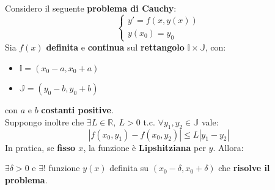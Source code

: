 \documentclass[a4paper, oneside]{article}
\newcommand\R{\mathbb{R}}
\newcommand\I{\mathbb{I}}
\newcommand\J{\mathbb{J}}
\begin{document}
\begin{theorem}
    Considero il seguente \textbf{problema di Cauchy}:
    \[\begin{cases}
        y'=f\left(x,y(x)\right) \\
        y(x_0)=y_0
    \end{cases}\]
    Sia $f(x)$ \textbf{definita} e \textbf{continua} sul \textbf{rettangolo} $\I\times\J$, con:
    \begin{itemize}
        \item $\I=(x_0-a,x_0+a)$
        \item $\J=(y_0-b,y_0+b)$
    \end{itemize}
    con $a$ e $b$ \textbf{costanti positive}.\\
    Suppongo inoltre che $\exists L\in\R, \ L>0$ t.c. $\forall y_1,y_2\in\J$ vale:
    \[\left|f(x_0,y_1)-f(x_0,y_2)\right|\leq L \left|y_1-y_2\right|\]
    In pratica, se \textbf{fisso $x$}, la funzione è \textbf{Lipshitziana} per $y$. Allora:
    \begin{center}
        $\exists\delta >0$ e $\exists !$ funzione $y(x)$ definita su $(x_0 - \delta,x_0 + \delta)$ che \textbf{risolve il problema}.
    \end{center}


\end{theorem}
\end{document}
